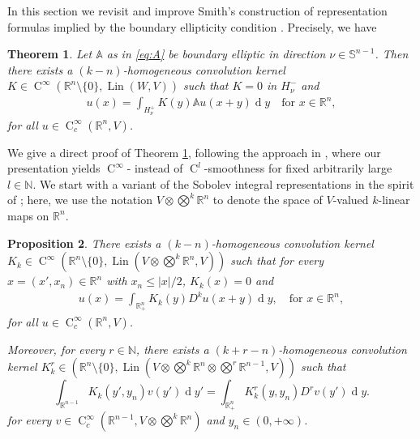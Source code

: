 \documentclass[a4paper,10pt]{amsart}
\newcommand{\R}{\mathbb R}
\newcommand{\N}{\mathbb N}
\renewcommand{\leq}{\leqslant}
\newcommand{\dif}{\mathrm{d}}
\renewcommand{\dif}{\operatorname{d}\!}
\newcommand{\hold}{\operatorname{C}}
\newcommand{\A}{\mathbb{A}}
\newcommand{\lin}{\operatorname{Lin}}
\newcommand{\Lin}{\operatorname{Lin}}
\numberwithin{equation}{section}
\newtheorem{theorem}{Theorem}[section]
\newtheorem{proposition}[theorem]{Proposition}
\theoremstyle{remark}
\numberwithin{equation}{section}
\begin{document}
	
	In this section  we revisit and improve Smith's construction of representation formulas implied by the boundary ellipticity condition
	\cite{Smith0,Smith}. Precisely, we have  
	\begin{theorem}\label{thm:smith}
		Let $\A$ as in \eqref{eq:A} be  boundary elliptic in direction $\nu\in\mathbb{S}^{n-1}$. Then there exists a $(k-n)$-homogeneous convolution kernel $K\in\hold^\infty(\R^n\setminus\{0\},\lin(W,V))$ such that $K=0$ in $H^-_\nu$ and
		\begin{align}\label{eq:smith}
			u(x)=\int_{H^+_\nu}K(y)\A u(x+y)\dif y\quad\text{for } x\in \R^n,
		\end{align}
		for all $u\in\hold^\infty_c(\R^n,V)$.
	\end{theorem} 
	We give a direct proof of Theorem \ref{thm:smith}, following the approach in \cite[Sec. 3]{Smith}, where our presentation yields \(\hold^\infty\)- instead of \(\hold^l\)-smoothness for fixed arbitrarily large \(l \in \N\). We start with a variant of the Sobolev integral representations in the spirit of \cite[Sec.~2]{Smith}; here, we use the notation $V\otimes\bigotimes^k\R^n$ to denote the space of $V$-valued $k$-linear maps on $\R^n$.
	
	\begin{proposition}\label{prop:sobolev}
		There exists a $(k-n)$-homogeneous convolution kernel  $K_k\in\hold^\infty(\R^n\setminus\{0\},\lin (V\otimes\bigotimes^k\R^n,V))$  such that for every \(x = (x', x_n) \in \R^n\) with \(x_n \leq \lvert x \rvert/2\), \(K_k (x) = 0\) and 
		\begin{align}\label{eq:sobolev}
			u(x)=\int_{\R^n_+}K_k(y)D^k u(x+y)\dif y,\quad\text{for }x\in\R^n,
		\end{align}
		for all $u\in\hold^\infty_c(\R^n,V)$.
		
		Moreover, for every \(r \in \N\),
		there exists a \( (k + r - n) \)-homogeneous convolution kernel \(K_k^r \in (\R^{n} \setminus \{0\}, \Lin (V \otimes \bigotimes^k \R^n \otimes \bigotimes^r \R^{n - 1}, V))\) such that 
		\begin{equation*}
			\int_{\R^{n - 1}} K_k (y', y_n) v (y') \dif y'
			= \int_{\R^n_+} K_{k}^r(y, y_n)D^r v(y')\dif y.
		\end{equation*}
		for every \(v \in\hold^\infty_c (\R^{n - 1}, V \otimes \bigotimes^k \R^n)\) and \(y_n \in (0, +\infty)\).
	\end{proposition}
	
\end{document}
